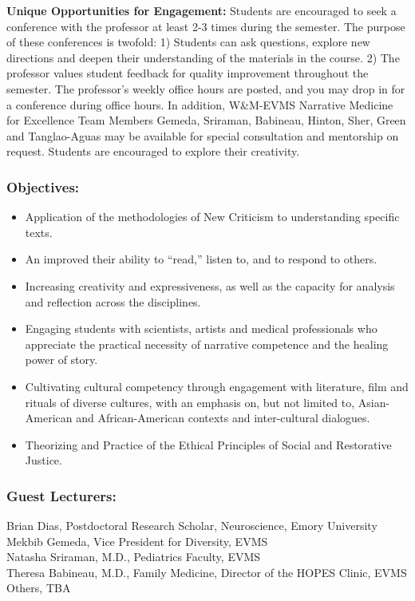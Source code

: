 \documentclass[12pt]{article}
\providecommand{\tightlist}{%
  \setlength{\itemsep}{0pt}\setlength{\parskip}{0pt}}
\begin{document}
\textbf{Unique Opportunities for Engagement:} Students are encouraged to
seek a conference with the professor at least 2-3 times during the
semester. The purpose of these conferences is twofold: 1) Students can
ask questions, explore new directions and deepen their understanding of
the materials in the course. 2) The professor values student feedback
for quality improvement throughout the semester. The professor's weekly
office hours are posted, and you may drop in for a conference during
office hours. In addition, W\&M-EVMS Narrative Medicine for Excellence
Team Members Gemeda, Sriraman, Babineau, Hinton, Sher, Green and
Tanglao-Aguas may be available for special consultation and mentorship
on request. Students are encouraged to explore their creativity.

\subsubsection{Objectives:}\label{objectives}

\begin{itemize}
\tightlist
\item
  Application of the methodologies of New Criticism to understanding
  specific texts.
\item
  An improved their ability to ``read,'' listen to, and to respond to
  others.
\item
  Increasing creativity and expressiveness, as well as the capacity for
  analysis and reflection across the disciplines.
\item
  Engaging students with scientists, artists and medical professionals
  who appreciate the practical necessity of narrative competence and the
  healing power of story.
\item
  Cultivating cultural competency through engagement with literature,
  film and rituals of diverse cultures, with an emphasis on, but not
  limited to, Asian-American and African-American contexts and
  inter-cultural dialogues.
\item
  Theorizing and Practice of the Ethical Principles of Social and
  Restorative Justice.
\end{itemize}

\subsubsection{Guest Lecturers:}\label{guest-lecturers}

Brian Dias, Postdoctoral Research Scholar, Neuroscience, Emory
University\\
Mekbib Gemeda, Vice President for Diversity, EVMS\\
Natasha Sriraman, M.D., Pediatrics Faculty, EVMS\\
Theresa Babineau, M.D., Family Medicine, Director of the HOPES Clinic,
EVMS\\
Others, TBA
\end{document}
